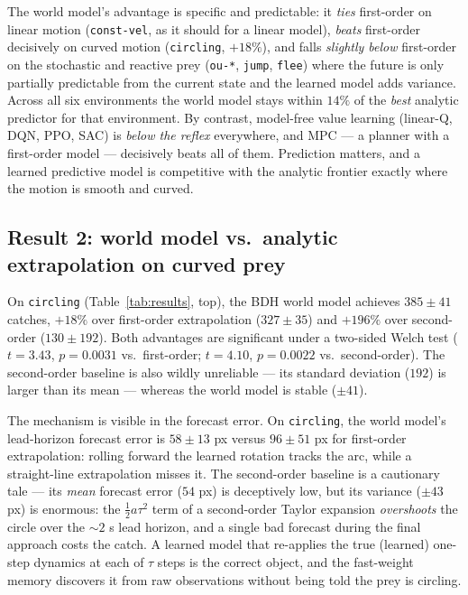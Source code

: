 \documentclass[11pt]{article}
\begin{document}
The world model's advantage is specific and predictable: it \emph{ties} first-order on linear
motion (\texttt{const-vel}, as it should for a linear model), \emph{beats} first-order
decisively on curved motion (\texttt{circling}, $+18\%$), and falls \emph{slightly below}
first-order on the stochastic and reactive prey (\texttt{ou-*}, \texttt{jump}, \texttt{flee})
where the future is only partially predictable from the current state and the learned model
adds variance. Across all six environments the world model stays within $14\%$ of the
\emph{best} analytic predictor for that environment. By contrast, model-free value learning
(linear-Q, DQN, PPO, SAC) is \emph{below the reflex} everywhere, and MPC --- a planner with a
first-order model --- decisively beats all of them. Prediction matters, and a learned
predictive model is competitive with the analytic frontier exactly where the motion is smooth
and curved.

\subsection{Result 2: world model vs.\ analytic extrapolation on curved prey}

On \texttt{circling} (Table~\ref{tab:results}, top), the BDH world model achieves
$385 \pm 41$ catches, \textbf{$+18\%$} over first-order extrapolation ($327 \pm 35$) and
\textbf{$+196\%$} over second-order ($130 \pm 192$). Both advantages are significant under a
two-sided Welch test ($t = 3.43$, $p = 0.0031$ vs.\ first-order; $t = 4.10$, $p = 0.0022$ vs.\
second-order). The second-order baseline is also wildly unreliable --- its standard deviation
($192$) is larger than its mean --- whereas the world model is stable ($\pm 41$).

The mechanism is visible in the forecast error. On \texttt{circling}, the world model's
lead-horizon forecast error is $58 \pm 13$ px versus $96 \pm 51$ px for first-order
extrapolation: rolling forward the learned rotation tracks the arc, while a straight-line
extrapolation misses it. The second-order baseline is a cautionary tale --- its \emph{mean}
forecast error ($54$ px) is deceptively low, but its variance ($\pm 43$ px) is enormous: the
$\tfrac12 a \tau^2$ term of a second-order Taylor expansion \emph{overshoots} the circle over
the $\sim\!2$ s lead horizon, and a single bad forecast during the final approach costs the
catch. A learned model that re-applies the true (learned) one-step dynamics at each of $\tau$
steps is the correct object, and the fast-weight memory discovers it from raw observations
without being told the prey is circling.
\end{document}
